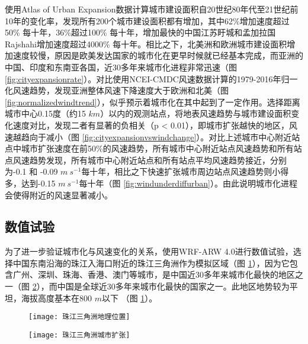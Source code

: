 使用Atlas of Urban Expansion数据计算城市建设面积自20世纪80年代至21世纪前10年的变化率，发现所有200个城市建设面积都有增加，其中62\%增加速度超过50\% 每十年，36\%超过100\% 每十年，增加最快的中国江苏盱城和孟加拉国Rajshahi增加速度超过4000\% 每十年。相比之下，北美洲和欧洲城市建设面积增加速度较慢，原因是欧美发达国家的城市化在更早时候就已经基本完成，而亚洲的中国、印度和东南亚各国，近30多年来城市化进程非常迅速（图 \ref{fig:cityexpansionrate}）。对比使用NCEI-CMDC风速数据计算的1979-2016年归一化风速趋势，发现亚洲整体风速下降速度大于欧洲和北美（图 \ref{fig:normalizedwindtrend}），似乎预示着城市化在其中起到了一定作用。选择距离城市中心0.15度（约15 $km$）以内的观测站点，将地表风速趋势与城市建设面积变化速度对比，发现二者有显著的负相关（p < 0.01），即城市扩张越快的地区，风速越趋向于减小（图 \ref{fig:cityexpansionvswindchange}）。对比上述城市中心附近站点中城市扩张速度在前50\%的风速趋势，所有城市中心附近站点风速趋势和所有站点风速趋势发现，所有城市中心附近站点和所有站点平均风速趋势接近，分别为-0.1 和 -0.09 $m ~ s^{-1}$每十年，相比之下快速扩张城市周边站点风速趋势则小得多，达到-0.15 $m ~ s^{-1}$每十年（图 \ref{fig:windunderdiffurban}）。由此说明城市化进程会使得附近的风速显著减小。

\subsection{数值试验}

为了进一步验证城市化与风速变化的关系，使用WRF-ARW 4.0进行数值试验，选择中国东南沿海的珠江入海口附近的珠江三角洲作为模拟区域（图 \ref{fig:PRDlocation}），因为它包含广州、深圳、珠海、香港、澳门等城市，是中国近30多年来城市化最快的地区之一（图 \ref{fig:PRDcityexpand}），而中国是全球近30多年来城市化最快的国家之一。此地区地势较为平坦，海拔高度基本在800 $m$以下 （图 \ref{fig:PRDlocation}）。

\begin{figure}[!htbp]
    \centering
    \texttt{[image: 珠江三角洲地理位置]}
    \label{fig:PRDlocation}
\end{figure}

\begin{figure}[!t]
    \centering
    \texttt{[image: 珠江三角洲城市扩张]}
    \label{fig:PRDcityexpand}
\end{figure}

